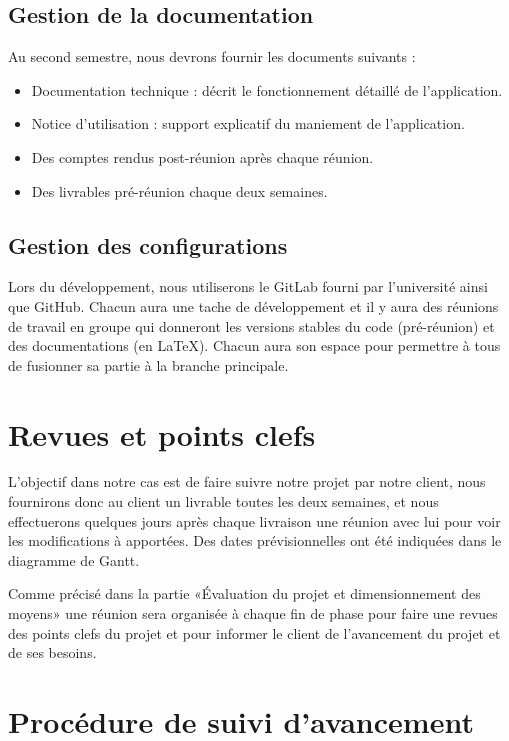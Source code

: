 \section{Gestion de la documentation}
Au second semestre, nous devrons fournir les documents suivants :

\begin{itemize}
    \item Documentation technique : décrit le fonctionnement détaillé de l’application.
    \item Notice d’utilisation : support explicatif du maniement de l’application.
    \item Des comptes rendus post-réunion après chaque réunion.
    \item Des livrables pré-réunion chaque deux semaines.\\ \newline
\end{itemize}

\section{Gestion des configurations}
Lors du développement, nous utiliserons le GitLab fourni par l’université ainsi que GitHub. Chacun
aura une tache de développement et il y aura des réunions de travail en groupe qui donneront les
versions stables du code (pré-réunion) et des documentations (en \LaTeX). Chacun aura son espace
pour permettre à tous de fusionner sa partie à la branche principale.


\chapter{Revues et points clefs}

L'objectif dans notre cas est de faire suivre notre projet par notre client,
nous fournirons donc au client un livrable toutes les deux semaines, et nous effectuerons
quelques jours après chaque livraison une réunion avec lui pour voir les modifications à
apportées. Des dates prévisionnelles ont été indiquées dans le diagramme de Gantt.\newline

Comme précisé dans la partie «Évaluation du projet et dimensionnement des moyens» une réunion sera
organisée à chaque fin de phase pour faire une revues des points clefs du projet et pour informer
le client de l'avancement du projet et de ses besoins.

\chapter{Procédure de suivi d'avancement}

